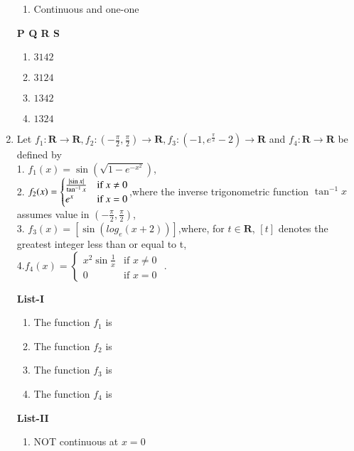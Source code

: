 \documentclass[journal,12pt,twocolumn]{IEEEtran}
\theoremstyle{remark}
\begin{document}
\begin{enumerate}
\begin{multicols}{2}
\begin{enumerate}[label=\arabic*.]
					\item  Continuous and one-one
				\end{enumerate}
		\end{multicols}
			\textbf{   P Q R S}
			\begin{enumerate}[label=(\alph*)]
				\item $ 3 1 4 2$
				\item$ 3 1 2 4$
				\item $1 3 4 2$ 
				\item $1 3 2 4$
			\end{enumerate}
            \item Let $f_1: \textbf{R}\to \textbf{R},f_2:(-\frac{\pi}{2},\frac{\pi}{2})\to \textbf{R}, f_3:(-1,e^\frac{\pi}{2}-2)\to \textbf{R}$ and $f_4: \textbf{R}\to \textbf{R}$ be defined by \\
            1. $f_1(x)=\sin({\sqrt{1-e^{-x^2}}})$, \\
            2. $f_2(x) =
             \begin{cases}
		 \frac{\left\vert\sin{x}\right\vert}{\tan^{-1}x} & \text{if } x \neq 0 \\
                 e^x & \text{if } x = 0 
                 \end{cases}$,where the inverse trigonometric function $\tan^{-1}x $ assumes value in $(-\frac{\pi}{2},\frac{\pi}{2})$,\\
            3. $f_3(x)=[\sin({log_e(x+2)})]$,where, for $t\in \textbf{R}$, $[t]$ denotes the greatest integer less than or equal to t, \\
            4.$f_4(x) =
        \begin{cases}
                 x^2\sin{\frac{1}{x}} & \text{if } x \neq 0 \\
                 0 & \text{if } x = 0 
                 \end{cases}$ .
                 \begin{multicols}{2} 
				\textbf{List-I} 
				\begin{enumerate}[label=\Alph*., start=16]
					\item The function $f_1$ is
					\item The function $f_2$ is 
					\item The function $f_3$ is 
					\item The function $f_4$ is
				\end{enumerate}
				\columnbreak
				\textbf{List-II}
				\begin{enumerate}[label=\arabic*.]
					\item  NOT continuous at $x = 0$ 

\end{enumerate}
\end{multicols}
\end{enumerate}
\end{document}
